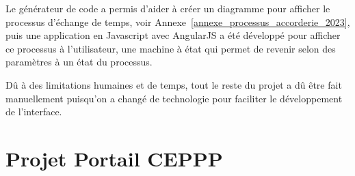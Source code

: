 Le générateur de code a permis d’aider à créer un diagramme pour afficher le processus d’échange de temps, voir Annexe~\ref{annexe_processus_accorderie_2023}, puis une application en Javascript avec AngularJS a été développé pour afficher ce processus à l’utilisateur, une machine à état qui permet de revenir selon des paramètres à un état du processus.

Dû à des limitations humaines et de temps, tout le reste du projet a dû être fait manuellement puisqu’on a changé de technologie pour faciliter le développement de l’interface.

\section{Projet Portail CEPPP}

